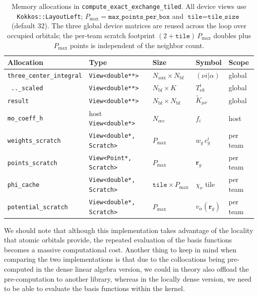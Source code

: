 \documentclass{article}
\begin{document}
\begin{table}[H]
  \centering
  {\small
    \begin{tabular}{@{}l l l l l@{}}
      \toprule
      Allocation & Type & Size & Symbol & Scope \\
      \midrule
      \texttt{three\_center\_integral} & \texttt{View<double**>}
      & $N_\text{aux}\times N_\text{bf}$ & $(\nu i|\alpha)$ & global \\
      \texttt{\ ..\_scaled}            & \texttt{View<double**>}
      & $N_\text{bf}\times K$            & $T^i_{\nu k}$ & global \\
      \texttt{result}                  & \texttt{View<double**>}
      & $N_\text{bf}\times N_\text{bf}$  & $\tilde K_{\mu\nu}$ & global \\
      \texttt{mo\_coeff\_h}            & host \texttt{View<double*>}
      & $N_\text{occ}$                   & $f_i$ & host \\
      \texttt{weights\_scratch}        & \texttt{View<double*, Scratch>}
      & $P_\text{max}$                   & $w_g\,c^i_g$ & per team \\
      \texttt{points\_scratch}         & \texttt{View<Point*, Scratch>}
      & $P_\text{max}$                   & $\mathbf r_g$ & per team \\
      \texttt{phi\_cache}              & \texttt{View<double*, Scratch>}
      & $\texttt{tile}\times P_\text{max}$ & $\chi_\nu$ tile & per team \\
      \texttt{potential\_scratch}      & \texttt{View<double*, Scratch>}
      & $P_\text{max}$                   & $v_\alpha(\mathbf
      r_g)$ & per team \\
      \bottomrule
  \end{tabular}}
  \caption{Memory allocations in
    \texttt{compute\_exact\_exchange\_tiled}. All device views use
    \texttt{Kokkos::LayoutLeft}; $P_\text{max}=\texttt{max\_points\_per\_box}$
    and $\texttt{tile}=\texttt{tile\_size}$ (default 32). The three
    global device matrices are reused across the loop over occupied
    orbitals; the per-team scratch footprint
    $(2+\texttt{tile})\,P_\text{max}$ doubles plus $P_\text{max}$ points
  is independent of the neighbor count.}
  \label{tab:tiled_rik_memory}
\end{table}

We should note that although this implementation takes advantage of
the locality that atomic orbitals provide, the repeated evaluation of
the basis functions becomes a massive computational cost. Another
thing to keep in mind when comparing the two implementations is that
due to the collocations being pre-computed in the dense linear
algebra version, we could in theory also offload the pre-computation
to another library, whereas in the locally dense version, we need to
be able to evaluate the basis functions within the kernel.
\end{document}
